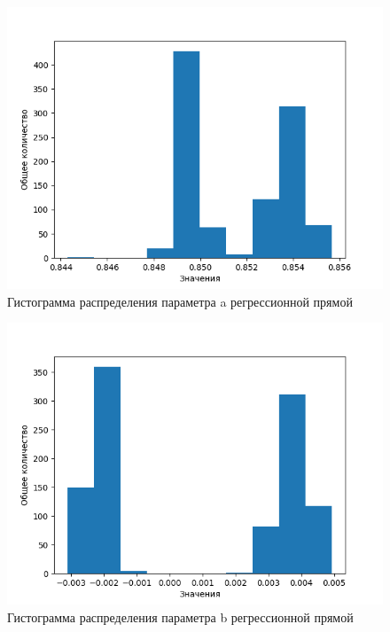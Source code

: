 \documentclass[12pt,a4paper]{article}
\begin{document}
\begin{figure}[H]
    \centering
    \includegraphics[scale=0.8]{images/a.png}
    \caption{Гистограмма распределения параметра a регрессионной прямой}
\end{figure}

\begin{figure}[H]
    \centering
    \includegraphics[scale=0.8]{images/b.png}
    \caption{Гистограмма распределения параметра b регрессионной прямой}
\end{figure}
\end{document}
